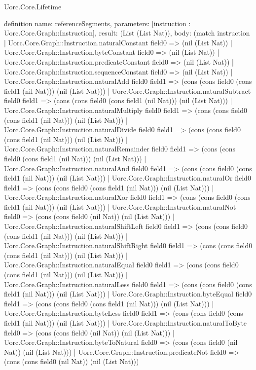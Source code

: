 \begin{lexlean}{Uorc.Core.Lifetime}
\begin{semanticmodule}
definition{
  name: referenceSegments,
  parameters: [instruction : Uorc.Core.Graph::Instruction],
  result: (List (List Nat)),
  body: (match instruction
    | Uorc.Core.Graph::Instruction.naturalConstant field0 => (nil (List Nat))
    | Uorc.Core.Graph::Instruction.byteConstant field0 => (nil (List Nat))
    | Uorc.Core.Graph::Instruction.predicateConstant field0 => (nil (List Nat))
    | Uorc.Core.Graph::Instruction.sequenceConstant field0 => (nil (List Nat))
    | Uorc.Core.Graph::Instruction.naturalAdd field0 field1 => (cons (cons field0 (cons field1 (nil Nat))) (nil (List Nat)))
    | Uorc.Core.Graph::Instruction.naturalSubtract field0 field1 => (cons (cons field0 (cons field1 (nil Nat))) (nil (List Nat)))
    | Uorc.Core.Graph::Instruction.naturalMultiply field0 field1 => (cons (cons field0 (cons field1 (nil Nat))) (nil (List Nat)))
    | Uorc.Core.Graph::Instruction.naturalDivide field0 field1 => (cons (cons field0 (cons field1 (nil Nat))) (nil (List Nat)))
    | Uorc.Core.Graph::Instruction.naturalRemainder field0 field1 => (cons (cons field0 (cons field1 (nil Nat))) (nil (List Nat)))
    | Uorc.Core.Graph::Instruction.naturalAnd field0 field1 => (cons (cons field0 (cons field1 (nil Nat))) (nil (List Nat)))
    | Uorc.Core.Graph::Instruction.naturalOr field0 field1 => (cons (cons field0 (cons field1 (nil Nat))) (nil (List Nat)))
    | Uorc.Core.Graph::Instruction.naturalXor field0 field1 => (cons (cons field0 (cons field1 (nil Nat))) (nil (List Nat)))
    | Uorc.Core.Graph::Instruction.naturalNot field0 => (cons (cons field0 (nil Nat)) (nil (List Nat)))
    | Uorc.Core.Graph::Instruction.naturalShiftLeft field0 field1 => (cons (cons field0 (cons field1 (nil Nat))) (nil (List Nat)))
    | Uorc.Core.Graph::Instruction.naturalShiftRight field0 field1 => (cons (cons field0 (cons field1 (nil Nat))) (nil (List Nat)))
    | Uorc.Core.Graph::Instruction.naturalEqual field0 field1 => (cons (cons field0 (cons field1 (nil Nat))) (nil (List Nat)))
    | Uorc.Core.Graph::Instruction.naturalLess field0 field1 => (cons (cons field0 (cons field1 (nil Nat))) (nil (List Nat)))
    | Uorc.Core.Graph::Instruction.byteEqual field0 field1 => (cons (cons field0 (cons field1 (nil Nat))) (nil (List Nat)))
    | Uorc.Core.Graph::Instruction.byteLess field0 field1 => (cons (cons field0 (cons field1 (nil Nat))) (nil (List Nat)))
    | Uorc.Core.Graph::Instruction.naturalToByte field0 => (cons (cons field0 (nil Nat)) (nil (List Nat)))
    | Uorc.Core.Graph::Instruction.byteToNatural field0 => (cons (cons field0 (nil Nat)) (nil (List Nat)))
    | Uorc.Core.Graph::Instruction.predicateNot field0 => (cons (cons field0 (nil Nat)) (nil (List Nat)))
}
\end{semanticmodule}
\end{lexlean}
